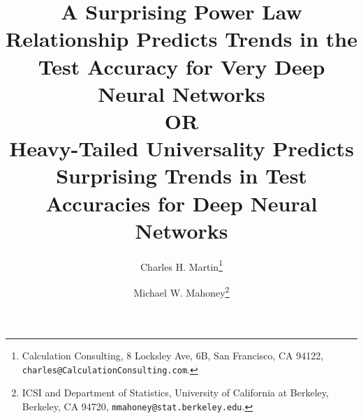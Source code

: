 \documentclass[11pt]{article}
\begin{document}
\title{%
A Surprising Power Law Relationship Predicts Trends in the Test Accuracy for Very Deep Neural Networks
\\ OR \\ 
Heavy-Tailed Universality Predicts Surprising Trends in Test Accuracies for Deep Neural Networks
}

\author{%
Charles H. Martin\thanks{Calculation Consulting, 8 Locksley Ave, 6B, San Francisco, CA 94122, \texttt{charles@CalculationConsulting.com}.} 
\and 
Michael W. Mahoney\thanks{ICSI and Department of Statistics, University of California at Berkeley, Berkeley, CA 94720, \texttt{mmahoney@stat.berkeley.edu}.}
}


\date{}
\maketitle







\appendix



%


{\small
%
%

}
\end{document}
